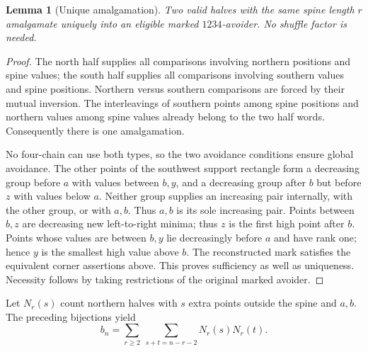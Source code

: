 \documentclass[11pt,letterpaper]{article}
\newtheorem{lemma}[theorem]{Lemma}
\theoremstyle{remark}\newtheorem{remark}[theorem]{Remark}
\numberwithin{equation}{section}
\begin{document}
\begin{lemma}[Unique amalgamation]\label{upo:1243:lem:glue}
Two valid halves with the same spine length $r$ amalgamate uniquely into
an eligible marked $1234$-avoider. No shuffle factor is needed.
\end{lemma}
\begin{proof}
The north half supplies all comparisons involving northern positions
and spine values; the south half supplies all comparisons involving
southern values and spine positions. Northern versus southern
comparisons are forced by their mutual inversion. The interleavings of
southern points among spine positions and northern values among spine
values already belong to the two half words. Consequently there is one
amalgamation.

No four-chain can use both types, so the two avoidance conditions ensure
global avoidance. The other points of the southwest support rectangle form a decreasing
group before $a$ with values between $b,y$, and a decreasing group
after $b$ but before $z$ with values below $a$. Neither group supplies
an increasing pair internally, with the other group, or with $a,b$.
Thus $a,b$ is its sole increasing pair. Points between
$b,z$ are decreasing new left-to-right minima; thus $z$ is the first high
point after $b$. Points whose values are between $b,y$ lie decreasingly
before $a$ and have rank one; hence $y$ is the smallest high value above
$b$. The reconstructed mark satisfies the equivalent corner assertions
above. This proves sufficiency as well as uniqueness. Necessity follows
by taking restrictions of the original marked avoider.
\end{proof}

Let $N_r(s)$ count northern halves with $s$ extra points outside the
spine and $a,b$. The preceding bijections yield
\begin{equation}\label{upo:1243:eq:Nproduct}
 b_n=\sum_{r\ge2}\ \sum_{s+t=n-r-2}N_r(s)N_r(t).
\end{equation}
\end{document}

